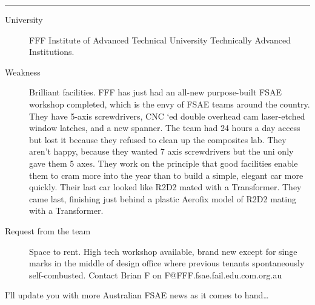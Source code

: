 \documentclass[10pt, a4paper, article, oneside, twocolumn, final]{memoir}
\begin{document}
\plainbreak{2}

\begin{description}
    \item[University] FFF Institute of Advanced Technical University Technically Advanced Institutions.
    \item[Weakness] Brilliant facilities. FFF has just had an all-new purpose-built FSAE workshop completed, which is the envy of FSAE teams around the country. They have 5-axis screwdrivers, CNC ‘ed double overhead cam laser-etched window latches, and a new spanner. The team had 24 hours a day access but lost it because they refused to clean up the composites lab. They aren't happy, because they wanted 7 axis screwdrivers but the uni only gave them 5 axes. They work on the principle that good facilities enable them to cram more into the year than to build a simple, elegant car more quickly. Their last car looked like R2D2 mated with a Transformer. They came last, finishing just behind a plastic Aerofix model of R2D2 mating with a Transformer.
    \item[Request from the team] Space to rent. High tech workshop available, brand new except for singe marks in the middle of design office where previous tenants spontaneously self-combusted. Contact Brian F on F@FFF.fsae.fail.edu.com.org.au 
\end{description}

I’ll update you with more Australian FSAE news as it comes to hand\ldots
\end{document}
